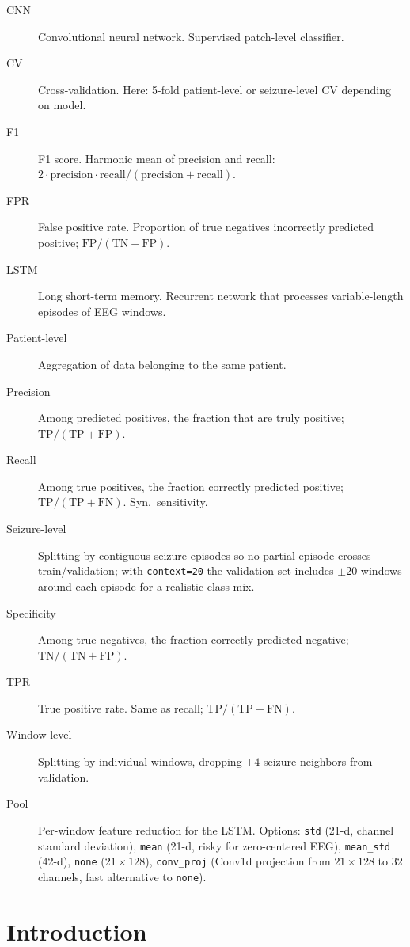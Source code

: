 \documentclass[11pt,a4paper]{article}
\begin{document}
\begin{description}
  \item[CNN] Convolutional neural network. Supervised patch-level classifier.
  \item[CV] Cross-validation. Here: 5-fold patient-level or seizure-level CV depending on model.
  \item[F1] F1 score. Harmonic mean of precision and recall: $2 \cdot \mathrm{precision} \cdot \mathrm{recall} / (\mathrm{precision} + \mathrm{recall})$.
  \item[FPR] False positive rate. Proportion of true negatives incorrectly predicted positive; $\mathrm{FP}/(\mathrm{TN}+\mathrm{FP})$.
  \item[LSTM] Long short-term memory. Recurrent network that processes variable-length episodes of EEG windows.
  \item[Patient-level] Aggregation of data belonging to the same patient.
  \item[Precision] Among predicted positives, the fraction that are truly positive; $\mathrm{TP}/(\mathrm{TP}+\mathrm{FP})$.
  \item[Recall] Among true positives, the fraction correctly predicted positive; $\mathrm{TP}/(\mathrm{TP}+\mathrm{FN})$. Syn.\ sensitivity.
\item[Seizure-level] Splitting by contiguous seizure episodes so no partial episode crosses train/validation; with \texttt{context=20} the validation set includes $\pm20$ windows around each episode for a realistic class mix.
\item[Specificity] Among true negatives, the fraction correctly predicted negative; $\mathrm{TN}/(\mathrm{TN}+\mathrm{FP})$.
\item[TPR] True positive rate. Same as recall; $\mathrm{TP}/(\mathrm{TP}+\mathrm{FN})$.
\item[Window-level] Splitting by individual windows, dropping $\pm 4$ seizure neighbors from validation.
\item[Pool] Per-window feature reduction for the LSTM. Options: \texttt{std} (21-d, channel standard deviation), \texttt{mean} (21-d, risky for zero-centered EEG), \texttt{mean\_std} (42-d), \texttt{none} ($21\times128$), \texttt{conv\_proj} (Conv1d projection from $21\times128$ to 32 channels, fast alternative to \texttt{none}).
\end{description}

\newpage

\section{Introduction}
\label{sec:intro}
\end{document}
